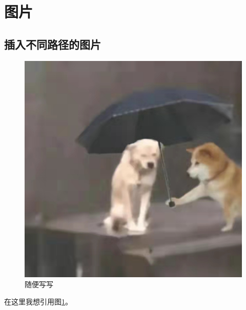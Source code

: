 \documentclass[UTF8,a4paper,10pt]{article}
\begin{document}
	 
	
	\section{图片}
	\subsection{插入不同路径的图片}
	\begin{figure} [!h] %
		\centering %
		\includegraphics[width=0.7\linewidth]{fig/1} %
		\caption{随便写写} %
		\label{fig1}
	\end{figure}
	在这里我想引用图\ref{fig1}。
	
\end{document}
